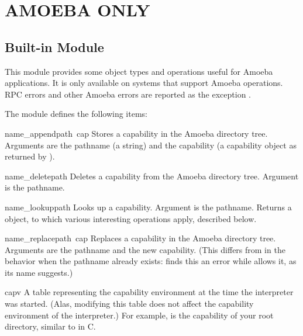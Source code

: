\chapter{AMOEBA ONLY}

\section{Built-in Module }

This module provides some object types and operations useful for
Amoeba applications.  It is only available on systems that support
Amoeba operations.  RPC errors and other Amoeba errors are reported as
the exception .

The module  defines the following items:

\renewcommand{\indexsubitem}{(in module amoeba)}
\begin{funcdesc}{name_append}{path\, cap}
Stores a capability in the Amoeba directory tree.
Arguments are the pathname (a string) and the capability (a capability
object as returned by
).
\end{funcdesc}

\begin{funcdesc}{name_delete}{path}
Deletes a capability from the Amoeba directory tree.
Argument is the pathname.
\end{funcdesc}

\begin{funcdesc}{name_lookup}{path}
Looks up a capability.
Argument is the pathname.
Returns a
object, to which various interesting operations apply, described below.
\end{funcdesc}

\begin{funcdesc}{name_replace}{path\, cap}
Replaces a capability in the Amoeba directory tree.
Arguments are the pathname and the new capability.
(This differs from
in the behavior when the pathname already exists:
finds this an error while
allows it, as its name suggests.)
\end{funcdesc}

\begin{datadesc}{capv}
A table representing the capability environment at the time the
interpreter was started.
(Alas, modifying this table does not affect the capability environment
of the interpreter.)
For example,
is the capability of your root directory, similar to
in C.
\end{datadesc}


